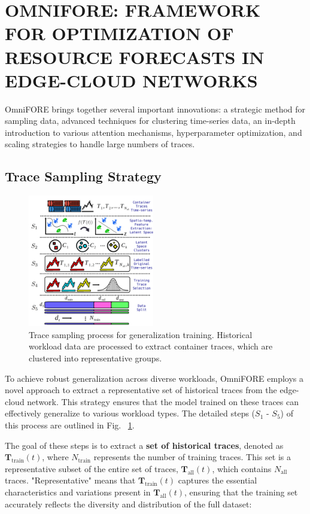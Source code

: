 \section{OMNIFORE: FRAMEWORK FOR OPTIMIZATION OF RESOURCE FORECASTS IN EDGE-CLOUD NETWORKS}
\label{sec: Proposed Solution}

OmniFORE brings together several important innovations: a strategic method for sampling data, advanced techniques for clustering time-series data, an in-depth introduction to various attention mechanisms, hyperparameter optimization, and scaling strategies to handle large numbers of traces.

\subsection{Trace Sampling Strategy}
\label{sec: Trace Sampling Strategy}


\begin{figure}
\centering
\includegraphics[width=0.49\textwidth]{img/proposed_solution_trace_selection.pdf}
\caption{Trace sampling process for generalization training. Historical workload data are processed to extract container traces, which are clustered into representative groups.}
\label{fig:proposed_solution_trace_selection}
\end{figure}

To achieve robust generalization across diverse workloads, OmniFORE employs a novel approach to extract a representative set of historical traces from the edge-cloud network. This strategy ensures that the model trained on these traces can effectively generalize to various workload types. The detailed steps ($S_1$ - $S_5$) of this process are outlined in Fig. ~\ref{fig:proposed_solution_trace_selection}.

The goal of these steps is to extract a \textbf{set of historical traces}, denoted as \(\mathbf{T}_{\text{train}}(t)\), where \(N_{\text{train}}\) represents the number of training traces. This set is a representative subset of the entire set of traces, \(\mathbf{T}_{\text{all}}(t)\), which contains \(N_{\text{all}}\) traces. "Representative" means that \(\mathbf{T}_{\text{train}}(t)\) captures the essential characteristics and variations present in \(\mathbf{T}_{\text{all}}(t)\), ensuring that the training set accurately reflects the diversity and distribution of the full dataset:

